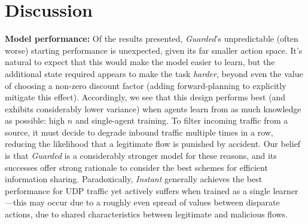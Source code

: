 \documentclass[10pt, times, comsoc]{IEEEtran}
\newcommand{\fakepara}[1]{\noindent\textbf{#1:}}
\begin{document}
\section{Discussion}\label{sec:discussion}



\fakepara{Model performance}
Of the results presented, \emph{Guarded}'s unpredictable (often worse) starting performance is unexpected, given its far smaller action space.
It's natural to expect that this would make the model easier to learn, but the additional state required appears to make the task \emph{harder}, beyond even the value of choosing a non-zero discount factor (adding forward-planning to explicitly mitigate this effect).
Accordingly, we see that this design performs best (and exhibits considerably lower variance) when agents learn from as much knowledge as possible: high $n$ and single-agent training.
To filter incoming traffic from a source, it must decide to degrade inbound traffic multiple times in a row, reducing the likelihood that a legitimate flow is punished by accident.
Our belief is that \emph{Guarded} is a considerably stronger model for these reasons, and its successes offer strong rationale to consider the best schemes for efficient information sharing.
Paradoxically, \emph{Instant} generally achieves the best performance for UDP traffic yet actively suffers when trained as a single learner---this may occur due to a roughly even spread of values between disparate actions, due to shared characteristics between legitimate and malicious flows.
\end{document}
